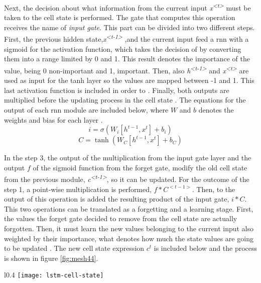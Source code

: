 	Next, the decision about what information from the current input \textit{x\textsuperscript{<t>}} must be taken to the cell state is performed. The gate that computes this operation receives the name of \textit{input gate}. This part can be divided into two different steps. First, the previous hidden state,\textit{x\textsuperscript{<t-1>}} ,and the current input feed a \acrshort{rnn} with a sigmoid for the activation function, which takes the decision of  by converting them into a range limited by 0 and 1. This result denotes the importance of the value, being 0 non-important and 1, important. Then, also \textit{h\textsuperscript{<t-1>}} and \textit{x\textsuperscript{<t>}} are used as input for the \acrshort{tanh} layer so the values are mapped between -1 and 1. This last activation function is included in order to . Finally, both outputs are multiplied before the updating process in the cell state \cite{Nguyen2018}. The equations for the output of each \acrshort{rnn} module are included below, where $W$ and $b$ denotes the weights and bias for each layer \cite{Olah2015}.
	\[ i = \sigma(W_{i}[h^{t-1}, x^{t}] + b_{i}) \]
	\[ C = \tanh(W_{C}[h^{t-1}, x^{t}] + b_{C}) \]
	
	In the step 3, the output of the multiplication from the input gate layer and the output $f$ of the sigmoid function from the forget gate, modify the old cell state from the previous module, \textit{c\textsuperscript{<t-1>}}, so it can be updated. For the outcome of the step 1, a point-wise multiplication is performed, $f * C^{<t-1>}$. Then, to the output of this operation is added the resulting product of the input gate, $i * C$. This two operations can be translated as a forgetting and a learning stage. First, the values the forget gate decided to remove from the cell state are actually forgotten. Then, it must learn the new values belonging to the current input also weighted by their importance, what denotes how much the state values are going to be updated \cite{Olah2015}. The new cell state expression $c^{t}$ is included below and the process is shown in figure \ref{fig:mesh44}.
	
	\begin{wrapfigure}{l}{0.4\textwidth}
		\centering
		\captionsetup{justification=centering}
		\texttt{[image: lstm-cell-state]}
		\vspace{-10pt}
		\caption{Step 3. Update cell state}
		\label{fig:mesh44}
	\end{wrapfigure}
	
